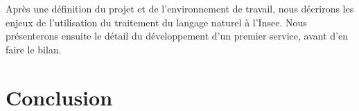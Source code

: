 \documentclass[11pt, oneside, a4paper, titlepage, french]{article}
\begin{document}
Après une définition du projet et de l'environnement de travail, nous décrirons les enjeux de l'utilisation du traitement du langage naturel à l'Insee. Nous présenterons ensuite le détail du développement d'un premier service, avant d'en faire le bilan.
\newpage


\newpage

\newpage

\newpage

\newpage

\section*{Conclusion}
\newpage



\newpage


\end{document}
